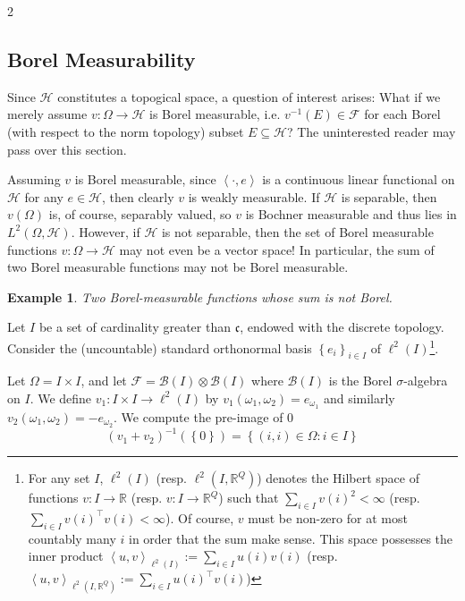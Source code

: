 \documentclass{article}
\numberwithin{theorem}{section}
\numberwithin{lemma}{section}
\numberwithin{definition}{section}
\numberwithin{assumption}{section}
\numberwithin{proposition}{section}
\numberwithin{remark}{section}
\numberwithin{corollary}{section}
\numberwithin{conjecture}{section}
\newtheorem{example}{Example}
\numberwithin{example}{section}
\newcommand{\R}{\mathbb{R}}
\newcommand{\bset}[1]{\left \lbrace #1 \right \rbrace}
\newcommand{\aset}[1]{\left \langle #1 \right \rangle}
\newcommand{\D}{\displaystyle}
\newcommand{\Cov}{\mathrm{Cov}}
\newcommand{\intp}[1] {\D \int_\Omega {#1 } \; d \mathbb P}
\begin{document}
\begin{multicols*}{2}

\subsection{Borel Measurability}

Since $\mathcal H$ constitutes a topogical space, a question of interest arises: What if we merely assume $v: \Omega \to \mathcal H$ is Borel measurable, i.e. $v^{-1}(E) \in \mathcal F$ for each Borel (with respect to the norm topology) subset $E \subseteq \mathcal H$? The uninterested reader may pass over this section. 

Assuming $v$ is Borel measurable, since $\aset{\cdot, e}$ is a continuous linear functional on $\mathcal H$ for any $e \in \mathcal H$, then clearly $v$ is weakly measurable. If $\mathcal H$ is separable, then $v(\Omega)$ is, of course, separably valued, so $v$ is Bochner measurable and thus lies in $L^2(\Omega, \mathcal H)$. However, if $\mathcal H$ is not separable, then the set of Borel measurable functions $v: \Omega \to \mathcal H$ may not even be a vector space! In particular, the sum of two Borel measurable functions may not be Borel measurable. 

\begin{example} Two Borel-measurable functions whose sum is not Borel. \end{example}
    Let $I$ be a set of cardinality greater than $\mathfrak c$, endowed with the discrete topology. Consider the (uncountable) standard orthonormal basis $\bset{e_i}_{i \in I}$ of $\ell^2(I)$\footnote{For any set $I$, $\ell^2(I)$ (resp. $\ell^2(I, \R^Q)$) denotes the Hilbert space of functions $v:I \to \R$ (resp. $v: I \to \R^Q$) such that $\sum_{i \in I} v(i)^2 < \infty$ (resp. $\sum_{i \in I} v(i)^\top v(i) < \infty$). Of course, $v$ must be non-zero for at most countably many $i$ in order that the sum make sense. This space possesses the inner product $\aset{u,v}_{\ell^2(I)} := \sum_{i \in I} u(i)v(i)$ (resp. $\aset{u,v}_{\ell^2(I, \R^Q)} := \sum_{i \in I} u(i)^\top v(i)$) }.

    Let $\Omega = I \times I$, and let $\mathcal F = \mathscr B(I) \otimes \mathscr B(I)$ where $\mathscr B(I)$ is the Borel $\sigma$-algebra on $I$. We define $v_1: I \times I \to \ell^2(I)$ by $v_1(\omega_1, \omega_2) = e_{\omega_1}$ and similarly $v_2(\omega_1, \omega_2) = -e_{\omega_2}$. We compute the pre-image of 0 $$(v_1 + v_2)^{-1}(\bset{0}) = \bset{(i, i) \in \Omega: i \in I} $$


\end{multicols*}
\end{document}

